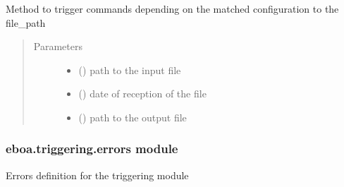 
\begin{fulllineitems}
\label{\detokenize{eboa.triggering:eboa.triggering.eboa_triggering.triggering}}
Method to trigger commands depending on the matched configuration to the file\_path
\begin{quote}\begin{description}
\item[{Parameters}] \leavevmode\begin{itemize}
\item {} 
 () \textendash{} path to the input file

\item {} 
 () \textendash{} date of reception of the file

\item {} 
 () \textendash{} path to the output file

\end{itemize}

\end{description}\end{quote}

\end{fulllineitems}



\subsubsection{eboa.triggering.errors module}
\label{\detokenize{eboa.triggering:module-eboa.triggering.errors}}\label{\detokenize{eboa.triggering:eboa-triggering-errors-module}}
Errors definition for the triggering module

